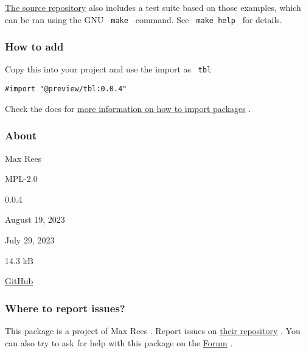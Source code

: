 \href{https://github.com/maxcrees/tbl.typ}{The source repository} also
includes a test suite based on those examples, which can be ran using
the GNU \texttt{\ make\ } command. See \texttt{\ make\ help\ } for
details.

\subsubsection{How to add}\label{how-to-add}

Copy this into your project and use the import as \texttt{\ tbl\ }

\begin{verbatim}
#import "@preview/tbl:0.0.4"
\end{verbatim}



Check the docs for
\href{https://typst.app/docs/reference/scripting/\#packages}{more
information on how to import packages} .

\subsubsection{About}\label{about}

\begin{description}
\tightlist
\item[Author :]
Max Rees
\item[License:]
MPL-2.0
\item[Current version:]
0.0.4
\item[Last updated:]
August 19, 2023
\item[First released:]
July 29, 2023
\item[Archive size:]
14.3 kB
\href{https://packages.typst.org/preview/tbl-0.0.4.tar.gz}{\pandocbounded{}}
\item[Repository:]
\href{https://github.com/maxcrees/tbl.typ}{GitHub}
\end{description}

\subsubsection{Where to report issues?}\label{where-to-report-issues}

This package is a project of Max Rees . Report issues on
\href{https://github.com/maxcrees/tbl.typ}{their repository} . You can
also try to ask for help with this package on the
\href{https://forum.typst.app}{Forum} .

